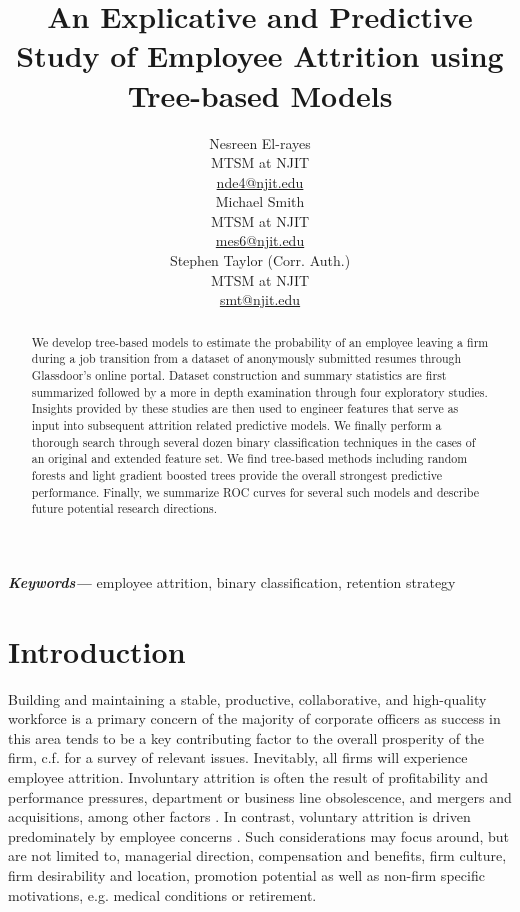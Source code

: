 \documentclass[10pt]{article}
\title{An Explicative and Predictive Study of Employee Attrition using Tree-based Models}
\author{Nesreen El-rayes \\
  MTSM at NJIT\\
  {\underline{nde4@njit.edu}} \\\And
  Michael Smith \\
  MTSM at NJIT \\
  {\underline{mes6@njit.edu }}\\\And 
  Stephen Taylor (Corr. Auth.)\\
  MTSM at NJIT \\
  {\underline{smt@njit.edu}} \\
  }
\date{}
\providecommand{\keywords}[1]{\textbf{\textit{Keywords---}} #1}
\begin{document}
\maketitle
\begin{abstract}
We develop tree-based models to estimate the probability of an employee leaving a 
firm during a job transition from a dataset of anonymously submitted resumes 
through Glassdoor's online portal.  Dataset  construction and summary 
statistics are first summarized followed by a more in depth examination  
through four exploratory studies.  Insights provided by these studies are then 
used to engineer features that serve as input into subsequent attrition related 
predictive models.  We finally perform a thorough search through several dozen binary 
classification techniques in the cases of an original and extended feature set.  
We find tree-based methods including random forests and light gradient boosted trees 
provide the overall strongest predictive performance.  Finally, we summarize ROC curves 
for several such models and describe future potential research directions. 
\end{abstract}

\keywords{employee attrition, binary classification, retention strategy}

\section{Introduction}
\hspace{\parindent}
Building and maintaining a stable, productive, collaborative, and high-quality workforce is a primary concern 
of the majority of corporate officers as success in this area tends to be a key contributing factor to the 
overall prosperity of the firm, c.f. \cite{Mir1993} for a survey of relevant issues.
Inevitably, all firms will experience employee attrition.  
Involuntary attrition is often the result of profitability and performance pressures, department or business 
line obsolescence, and mergers and acquisitions, among other factors \cite{Datta2009,Grip2006,SHAU1998}.  In contrast,
voluntary attrition is driven predominately by employee concerns \cite{Singh2012}.  Such considerations 
may focus around, but are not limited to, managerial direction, compensation and benefits, firm culture, 
firm desirability and location, promotion potential as well as non-firm specific motivations, e.g. medical 
conditions or retirement. 
  
\end{document}
